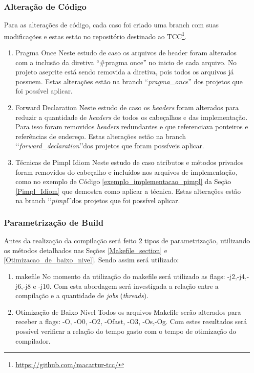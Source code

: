 \subsubsection{Alteração de Código}

 Para as alterações de código, cada caso foi criado
 uma branch com suas modificações e estas estão no repositório
 destinado ao TCC\footnote{\url{https://github.com/macartur-tcc/}}.

    \begin{enumerate}
        \item Pragma Once
        \subitem Neste estudo de caso os arquivos de header foram alterados
 com a inclusão da diretiva “\#pragma once” no inicio de cada arquivo.
 No projeto aseprite está sendo removida a diretiva, pois todos os arquivos já possuem.
Estas alterações estão na branch “\textit{pragma\_once}” dos projetos que foi possível aplicar.
        \item Forward Declaration
        \subitem Neste estudo de caso os \textit{headers} foram alterados para reduzir
 a quantidade de \textit{headers} de todos os cabeçalhos e das implementação.
 Para isso foram removidos \textit{headers} redundantes e que referenciava
 ponteiros e referências de endereço.
Estas alterações estão na branch \lq\lq\textit{forward\_declaration}\rq\rq dos projetos que foram possíveis  aplicar.
        \item Técnicas de Pimpl Idiom
        \subitem Neste estudo de caso atributos e métodos privados foram removidos do cabeçalho
 e incluídos nos arquivos de implementação, como no exemplo de Código \ref{exemplo_implementacao_pimpl} da Seção \ref{Pimpl_Idiom}
 que demostra como aplicar a técnica.
Estas alterações estão na branch \lq\lq\textit{pimpl}\rq\rq dos projetos que foi possível aplicar.
    \end{enumerate}

\subsubsection{Parametrização de Build}

	Antes da realização da compilação será feito 2 tipos de parametrização,
 utilizando os métodos detalhados nas Seções \ref{Makefile_section} e 
\ref{Otimizacao_de_baixo_nivel}. Sendo assim será utilizado: 

        \begin{enumerate}
            \item makefile
                \subitem No momento da utilização do makefile será utilizado
 as flags: -j2,-j4,-j6,-j8 e -j10.
 Com esta abordagem será investigada a relação entre a compilação
 e a quantidade de \textit{jobs} (\textit{threads}).
            \item Otimização de Baixo Nível
                \subitem Todos os arquivos Makefile serão
 alterados para receber a flags: -O, -O0, -O2, -Ofast, -O3, -Os,-Og.
 Com estes resultados será possível verificar a relação do tempo gasto com
 o tempo de otimização do compilador.
        \end{enumerate}

